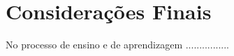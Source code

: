 \documentclass[Tese.tex]{subfiles}
\begin{document}
\chapter*{Considerações Finais}



No processo de ensino e de aprendizagem ................
\end{document}
